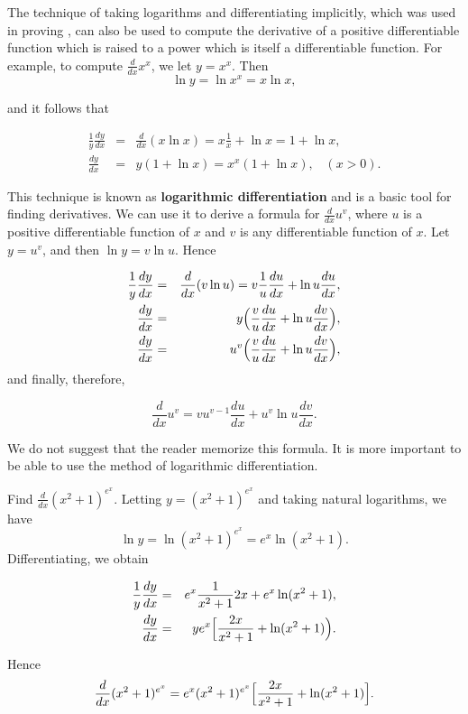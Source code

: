The technique of taking logarithms and differentiating implicitly,
which was used in proving ,
can also be used to compute the derivative of a positive differentiable function which is raised to a power which is itself a differentiable function. For example, to compute $\frac{d}{dx} x^{x}$, 
we let $y = x^{x}$. Then 
$$
\ln y= \ln x^{x}= x \ln x, 
$$

\noindent and it follows that

\begin{eqnarray*}
\frac{1}{y} \frac{dy}{dx} &=& \frac{d}{dx} (x \ln x) = x \frac{1}{x} + \ln x = 1 + \ln x, \\
            \frac{dy}{dx} &=& y( 1 + \ln x) = x^{x} ( 1 + \ln x), \;\;\;(x > 0). 
\end{eqnarray*}

\noindent This technique is known as \textbf{logarithmic differentiation} and is a basic tool for finding derivatives. We can use it to derive a formula for $\frac{d}{dx} u^{v}$, where $u$ is a positive differentiable function of $x$ and $v$ is any differentiable function of $x$.  Let $y = u^v$, and then $\ln y = v \ln u$. Hence

\begin{eqnarray*}
\frac{1}{y} \frac{dy}{dx} 
&=& \frac{d}{dx} (v \ln u) = v \frac{1}{u} \frac{du}{dx} + \ln u \frac{du}{dx},\\
\frac{dy}{dx} &=& y \Bigl( \frac{v}{u} \frac{du}{ dx} + \ln u \frac{dv}{dx} \Bigr),\\
\frac{dy}{dx} &=& u^{v}  \Bigl( \frac{v}{u} \frac{du}{dx} + \ln u \frac{dv}{dx} \Bigr),
\end{eqnarray*}
\noindent and finally, therefore, 

\begin{equation}
\frac{d}{dx} u^{v} = vu^{v - 1}\frac{du}{dx} + u^{v} \ln u \frac{dv}{dx}.
\label{eq5.4.3}
\end{equation}

\noindent We do not suggest that the reader memorize this formula. It is more important to be able to use the method of logarithmic differentiation.
\medskip 

\begin{example}
Find $\frac{d}{dx} (x^2 + 1) ^{e^x}$.  Letting $y = (x^{2} + 1)^{e^x}$ and taking natural logarithms, we have
$$
\ln y = \ln (x^2 + 1)^{e^x} = e^x \ln (x^2 + 1).
$$
\noindent Differentiating, we obtain 

\begin{eqnarray*}
\frac{1}{y} \frac{dy}{dx} &=& e^{x} \frac {1}{x^{2}+1} 2x + e^{x} \ln (x^{2} + 1),\\
\frac{dy}{dx}&=& ye^{x} \Bigl[ \frac{2x}{x^2 + 1} + \ln (x^2 + 1) \Bigr).
\end{eqnarray*}

\noindent Hence
$$
\frac{d}{dx} (x^2 + 1)^{e^x} = e^{x}(x^2 + 1)^{e^{x}} \Bigl[ \frac{2x}{x^2 + 1} + \ln (x^{2} + 1) \Bigr].
$$
\end{example}


